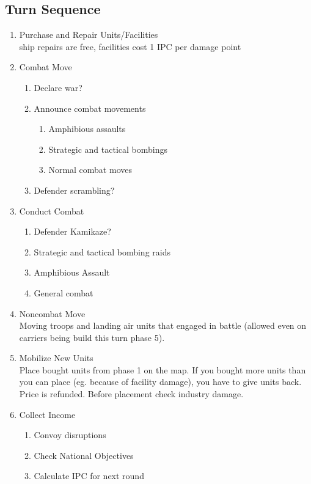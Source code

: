\documentclass[10pt,twoside]{article}
\begin{document}
\begin{multicols*}{3}

\section*{Turn Sequence}
\begin{enumerate}
\item Purchase and Repair Units/Facilities\\
ship repairs are free, facilities cost 1 IPC per damage point 
\item Combat Move
\begin{enumerate}
\item Declare war?
\item Announce combat movements
\begin{enumerate}
\item Amphibious assaults
\item Strategic and tactical bombings
\item Normal combat moves
\end{enumerate}
\item Defender scrambling?
\end{enumerate}
\item Conduct Combat
\begin{enumerate}
\item Defender Kamikaze?
\item Strategic and tactical bombing raids
\item Amphibious Assault
\item General combat
\end{enumerate}
\item Noncombat Move\\
Moving troops and landing air units that engaged in battle (allowed even on carriers being build this turn phase 5).
\item Mobilize New Units\\
Place bought units from phase 1 on the map. If you bought more units than you can place (eg. because of facility damage), you have to give units back. Price is refunded. Before placement check industry damage.
\item Collect Income
\begin{enumerate}
\item Convoy disruptions
\item Check National Objectives
\item Calculate IPC for next round
\end{enumerate}
\end{enumerate}
\columnbreak


\end{multicols*}
\end{document}
